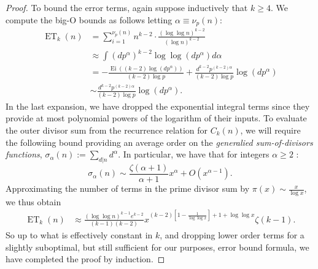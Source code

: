 \documentclass[11pt,reqno,a4letter]{article}
\numberwithin{figure}{section}
\numberwithin{table}{section}
\theoremstyle{plain}
\numberwithin{theorem}{section}
\theoremstyle{definition}
\begin{document}
\begin{proof}
To bound the error terms, again suppose inductively that $k \geq 4$. We compute the 
big-O bounds as follows letting $\alpha \equiv \nu_p(n)$: 
\begin{align*} 
\operatorname{ET}_k(n) & = 
     \sum_{i=1}^{\nu_p(n)} n^{k-2} \cdot \frac{(\log\log n)^{k-2}}{(\log n)^{k-2}} \\ 
     & \approx 
     \int (dp^{\alpha})^{k-2} \log\log(dp^{\alpha}) d\alpha \\ 
     & = -\frac{\operatorname{Ei}((k-2) \log(dp^{\alpha}))}{(k-2) \log p} + 
     \frac{d^{k-2} p^{(k-2)\alpha}}{(k-2) \log p} \log(dp^{\alpha}) \\ 
     & \sim \frac{d^{k-2} p^{(k-2)\alpha}}{(k-2) \log p} \log(dp^{\alpha}). 
\end{align*} 
In the last expansion, we have dropped the exponential integral terms since they provide at most 
polynomial powers of the logarithm of their inputs. 
To evaluate the outer divisor sum from the recurrence relation for $C_k(n)$, we will require the 
followiing bound providing an average order on the \emph{generalied sum-of-divisors functions}, 
$\sigma_{\alpha}(n) := \sum_{d|n} d^{\alpha}$. In particular, we have that for integers $\alpha \geq 2$ 
\cite[\S 27.11]{NISTHB}: 
\[
\sigma_{\alpha}(n) \sim \frac{\zeta(\alpha+1)}{\alpha+1} x^{\alpha} + O(x^{\alpha-1}). 
\]
Approximating the number of terms in the prime divisor sum by $\pi(x) \sim \frac{x}{\log x}$, 
we thus obtain 
\begin{align*} 
\operatorname{ET}_k(n) & \approx \frac{(\log\log n)^{k-1} e^{k-2}}{(k-1)(k-2)} 
     x^{(k-2)\left[1-\frac{1}{\log\log x}\right]+1+\log\log x} \zeta(k-1). 
\end{align*} 
So up to what is effectively constant in $k$, and dropping lower order terms for a slightly 
suboptimal, but still sufficient for our purposes, error bound formula, 
we have completed the proof by induction. 
\end{proof} 
\end{document}
